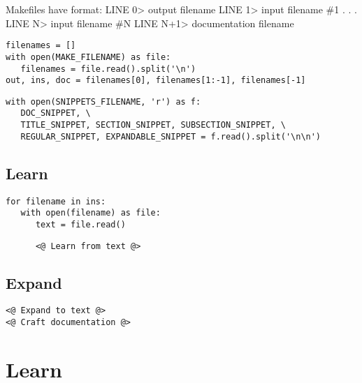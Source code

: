 \documentclass{article}
\begin{document}
Makefiles have format:
LINE 0> output filename
LINE 1> input filename \#1
. . .
LINE N> input filename \#N
LINE N+1> documentation filename

{\color{YellowOrange}\begin{verbatim}filenames = []
with open(MAKE_FILENAME) as file:
   filenames = file.read().split('\n')
out, ins, doc = filenames[0], filenames[1:-1], filenames[-1]
\end{verbatim}}{\color{YellowOrange}\begin{verbatim}with open(SNIPPETS_FILENAME, 'r') as f:
   DOC_SNIPPET, \
   TITLE_SNIPPET, SECTION_SNIPPET, SUBSECTION_SNIPPET, \
   REGULAR_SNIPPET, EXPANDABLE_SNIPPET = f.read().split('\n\n')
\end{verbatim}}\subsection{Learn}

{\color{YellowOrange}\begin{verbatim}for filename in ins:
   with open(filename) as file:
      text = file.read()
\end{verbatim}}{\color{MidnightBlue}\begin{verbatim}      <@ Learn from text @>
\end{verbatim}}
\subsection{Expand}

{\color{MidnightBlue}\begin{verbatim}<@ Expand to text @>
<@ Craft documentation @>
\end{verbatim}}
\section{Learn}
\end{document}
